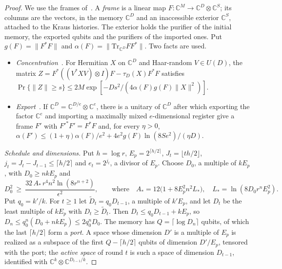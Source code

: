 \begin{proof}
We use the frames of~\cite[Appendix~A]{DouglasMghirbiB}. A \emph{frame} is a linear map $F:\mathbb C^M\to\mathbb C^D\otimes\mathbb C^S$; its columns
are the vectors, in the memory $\mathbb C^D$ and an inaccessible exterior $\mathbb C^S$, attached to the Kraus histories. The exterior holds the
purifier of the initial memory, the exported qubits and the purifiers of the imported ones. Put $g(F)=\|F^*F\|$ and
$\alpha(F)=\|\mathrm{Tr}_{\mathbb C^D}FF^*\|$. Two facts are used.
\begin{itemize}[leftmargin=1.2em,itemsep=1pt]
\item \emph{Concentration}~\cite[Lemma~A.1]{DouglasMghirbiB}. For Hermitian $X$ on $\mathbb C^D$ and Haar-random $V\in U(D)$, the matrix
$Z=F^*((V^*XV)\otimes I)F-\tau_D(X)F^*F$ satisfies $\Pr\{\|Z\|\ge s\}\le2M\exp[-Ds^2/(4\alpha(F)g(F)\|X\|^2)]$.
\item \emph{Export}~\cite[Lemma~A.4]{DouglasMghirbiB}. If $\mathbb C^D=\mathbb C^{D/e}\otimes\mathbb C^e$, there is a unitary of $\mathbb C^D$ after
which exporting the factor $\mathbb C^e$ and importing a maximally mixed $e$-dimensional register give a frame $F'$ with $F'^*F'=F^*F$ and, for every
$\eta>0$, $\alpha(F')\le(1+\eta)\alpha(F)/e^2+4e^2g(F)\ln(8Se^2)/(\eta D)$.
\end{itemize}

\emph{Schedule and dimensions.} Put $h=\log r$, $E_p=2^{\lceil h/2\rceil}$, $J_t=\lfloor th/2\rfloor$, $j_t=J_t-J_{t-1}\le\lceil h/2\rceil$ and
$e_t=2^{j_t}$, a divisor of $E_p$. Choose $D_0$, a multiple of $kE_p$, with $D_0\ge nkE_p$ and
\begin{equation}\label{eq:D0}
D_0^2\ \ge\ \frac{32\,A_*\,r^4n^2\ln(8r^{n+2})}{\epsilon^2},\qquad\text{where}\quad A_*=12\bigl(1+8E_p^2n^2L_*\bigr),\quad L_*=\ln(8D_0r^nE_p^2).
\end{equation}
Put $q_0=k'/k$. For $t\ge1$ let $\widetilde D_t=q_0D_{t-1}$, a multiple of $k'E_p$, and let $D_t$ be the least multiple of $kE_p$ with
$D_t\ge\widetilde D_t$. Then $D_t\le q_0D_{t-1}+kE_p$, so $D_n\le q_0^n(D_0+nkE_p)\le2q_0^nD_0$. The memory has $Q=\lceil\log D_n\rceil$ qubits, of which the last $\lceil h/2\rceil$
form a \emph{port}. A space whose dimension $D'$ is a multiple of $E_p$ is realized as a subspace of the first $Q-\lceil h/2\rceil$ qubits of dimension
$D'/E_p$, tensored with the port; the \emph{active space} of round $t$ is such a space of dimension $D_{t-1}$, identified with
$\mathbb C^k\otimes\mathbb C^{D_{t-1}/k}$.


\end{proof}
